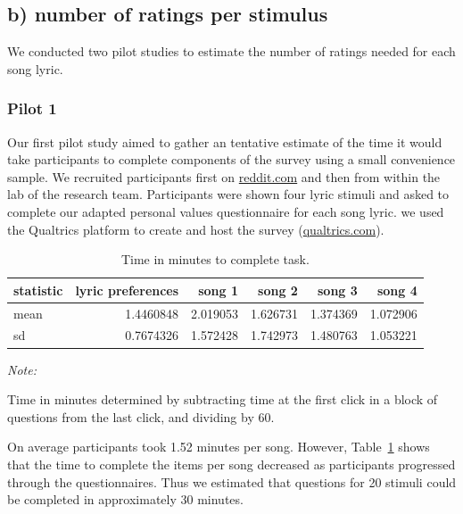 \documentclass[
  letterpaper,
  DIV=11,
  numbers=noendperiod]{scrartcl}
\begin{document}
\hypertarget{b-number-of-ratings-per-stimulus}{%
\subsection{b) number of ratings per
stimulus}\label{b-number-of-ratings-per-stimulus}}

We conducted two pilot studies to estimate the number of ratings needed
for each song lyric.

\hypertarget{sec-pilot1}{%
\subsubsection{Pilot 1}\label{sec-pilot1}}

Our first pilot study aimed to gather an tentative estimate of the time
it would take participants to complete components of the survey using a
small convenience sample. We recruited participants first on
\href{https://www.reddit.com/r/SampleSize}{reddit.com} and then from
within the lab of the research team. Participants were shown four lyric
stimuli and asked to complete our adapted personal values questionnaire
for each song lyric. we used the Qualtrics platform to create and host
the survey (\href{https://www.qualtrics.com}{qualtrics.com}).

\hypertarget{tbl-1}{}
\begin{table}
\caption{\label{tbl-1}Time in minutes to complete task. }\tabularnewline

\centering
\begin{threeparttable}
\begin{tabular}{l|r|r|r|r|r}
\hline
statistic & lyric preferences & song 1 & song 2 & song 3 & song 4\\
\hline
mean & 1.4460848 & 2.019053 & 1.626731 & 1.374369 & 1.072906\\
\hline
sd & 0.7674326 & 1.572428 & 1.742973 & 1.480763 & 1.053221\\
\hline
\end{tabular}
\begin{tablenotes}[para]
\item \textit{Note: } 
\item Time in minutes determined by subtracting time at the first click in a block of questions from the last click, and dividing by 60.
\end{tablenotes}
\end{threeparttable}
\end{table}

On average participants took 1.52 minutes per song. However,
Table~\ref{tbl-1} shows that the time to complete the items per song
decreased as participants progressed through the questionnaires. Thus we
estimated that questions for 20 stimuli could be completed in
approximately 30 minutes.
\end{document}
